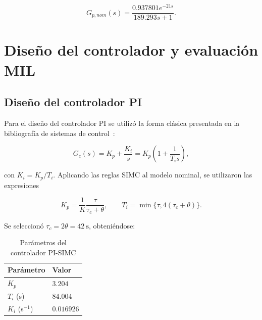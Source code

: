 \documentclass[journal]{IEEEtran}
\begin{document}
\begin{equation}
                G_{p,nom}(s)=\frac{0.937801e^{-21s}}{189.293s+1}.
\label{eq:modelo_nominal_v2}
\end{equation}


\section{Diseño del controlador y evaluación MIL}
\subsection{Diseño del controlador PI}

Para el diseño del controlador PI se utilizó la forma clásica presentada en la bibliografía de sistemas de
control~\cite{nise_control,ogata_control}:

\begin{equation}
        G_c(s)=K_p+\frac{K_i}{s}=K_p\left(1+\frac{1}{T_i s}\right),
\label{eq:pi_v2}
\end{equation}

con $K_i=K_p/T_i$. Aplicando las reglas SIMC al modelo nominal, se utilizaron
las expresiones

\begin{equation}
        K_p=\frac{1}{K}\frac{\tau}{\tau_c+\theta},
        \qquad
        T_i=\min\{\tau,4(\tau_c+\theta)\}.
\label{eq:simc_v2}
\end{equation}


Se seleccionó $\tau_c=2\theta=42~\mathrm{s}$, obteniéndose:

\begin{table}[H]
    \centering
    \caption{Parámetros del controlador PI-SIMC}
    \label{tab:parametros_controlador_v2}
    \renewcommand{\arraystretch}{1.5}
    \begin{tabularx}{\columnwidth}{@{}YY@{}}
        \toprule
        \textbf{Parámetro} & \textbf{Valor} \\
        \midrule
        $K_p$ & $3.204$ \\
        $T_i$ (s) & $84.004$ \\
        $K_i$ (s$^{-1}$) & $0.016926$ \\
        \bottomrule
    \end{tabularx}
\end{table}
\end{document}
